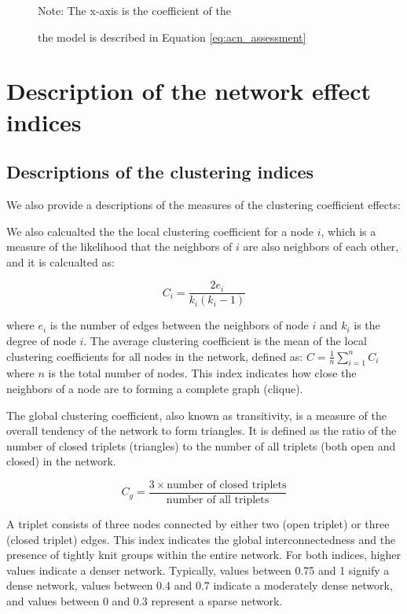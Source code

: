 \documentclass[11pt]{article}
\begin{document}
\begin{figure}[H]
  Note: The x-axis is the coefficient of the 

  the model is described in Equation \eqref{eq:acn_assessment}

\end{figure}

\newpage

\section{Description of the network effect indices} \label{sec:network_effect_indices}

\subsection{Descriptions of the clustering indices} \label{subsec:descriptions_clustering_indices}

We also provide a descriptions of the measures of the clustering coefficient effects:

We also calcualted the the local clustering coefficient for a node $i$, which is a measure of the likelihood that the neighbors of $i$ are also neighbors of each other, and it is calcualted as:

\begin{equation*}
  C_i = \frac{2e_i}{k_i(k_i - 1)}  
\end{equation*}

where $e_i$ is the number of edges between the neighbors of node $i$ and $k_i$ is the degree of node $i$. The average clustering coefficient is the mean of the local clustering coefficients for all nodes in the network, defined as: $C = \frac{1}{n} \sum_{i=1}^n C_i$ where $n$ is the total number of nodes. This index indicates how close the neighbors of a node are to forming a complete graph (clique).

The global clustering coefficient, also known as transitivity, is a measure of the overall tendency of the network to form triangles. It is defined as the ratio of the number of closed triplets (triangles) to the number of all triplets (both open and closed) in the network.

\begin{equation*}
  C_g = \frac{3 \times \text{number of closed triplets}}{\text{number of all triplets}}  
\end{equation*}

A triplet consists of three nodes connected by either two (open triplet) or three (closed triplet) edges. This index indicates the global interconnectedness and the presence of tightly knit groups within the entire network. For both indices, higher values indicate a denser network. Typically, values between 0.75 and 1 signify a dense network, values between 0.4 and 0.7 indicate a moderately dense network, and values between 0 and 0.3 represent a sparse network.
\end{document}
